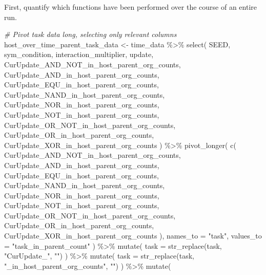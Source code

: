 \documentclass[
]{book}
\newenvironment{Shaded}{\begin{snugshade}}{\end{snugshade}}
\newcommand{\AttributeTok}[1]{\textcolor[rgb]{0.77,0.63,0.00}{#1}}
\newcommand{\CommentTok}[1]{\textcolor[rgb]{0.56,0.35,0.01}{\textit{#1}}}
\newcommand{\FunctionTok}[1]{\textcolor[rgb]{0.00,0.00,0.00}{#1}}
\newcommand{\NormalTok}[1]{#1}
\newcommand{\OtherTok}[1]{\textcolor[rgb]{0.56,0.35,0.01}{#1}}
\newcommand{\SpecialCharTok}[1]{\textcolor[rgb]{0.00,0.00,0.00}{#1}}
\newcommand{\StringTok}[1]{\textcolor[rgb]{0.31,0.60,0.02}{#1}}
\begin{document}
First, quantify which functions have been performed over the course of an entire run.

\begin{Shaded}
\begin{Highlighting}[]
\CommentTok{\# Pivot task data long, selecting only relevant columns}
\NormalTok{host\_over\_time\_parent\_task\_data }\OtherTok{\textless{}{-}}\NormalTok{ time\_data }\SpecialCharTok{\%\textgreater{}\%}
  \FunctionTok{select}\NormalTok{(}
\NormalTok{    SEED,}
\NormalTok{    sym\_condition,}
\NormalTok{    interaction\_multiplier,}
\NormalTok{    update,}
\NormalTok{    CurUpdate\_AND\_NOT\_in\_host\_parent\_org\_counts,}
\NormalTok{    CurUpdate\_AND\_in\_host\_parent\_org\_counts,}
\NormalTok{    CurUpdate\_EQU\_in\_host\_parent\_org\_counts,}
\NormalTok{    CurUpdate\_NAND\_in\_host\_parent\_org\_counts,}
\NormalTok{    CurUpdate\_NOR\_in\_host\_parent\_org\_counts,}
\NormalTok{    CurUpdate\_NOT\_in\_host\_parent\_org\_counts,}
\NormalTok{    CurUpdate\_OR\_NOT\_in\_host\_parent\_org\_counts,}
\NormalTok{    CurUpdate\_OR\_in\_host\_parent\_org\_counts,}
\NormalTok{    CurUpdate\_XOR\_in\_host\_parent\_org\_counts}
\NormalTok{  ) }\SpecialCharTok{\%\textgreater{}\%}
  \FunctionTok{pivot\_longer}\NormalTok{(}
    \FunctionTok{c}\NormalTok{(}
\NormalTok{      CurUpdate\_AND\_NOT\_in\_host\_parent\_org\_counts,}
\NormalTok{      CurUpdate\_AND\_in\_host\_parent\_org\_counts,}
\NormalTok{      CurUpdate\_EQU\_in\_host\_parent\_org\_counts,}
\NormalTok{      CurUpdate\_NAND\_in\_host\_parent\_org\_counts,}
\NormalTok{      CurUpdate\_NOR\_in\_host\_parent\_org\_counts,}
\NormalTok{      CurUpdate\_NOT\_in\_host\_parent\_org\_counts,}
\NormalTok{      CurUpdate\_OR\_NOT\_in\_host\_parent\_org\_counts,}
\NormalTok{      CurUpdate\_OR\_in\_host\_parent\_org\_counts,}
\NormalTok{      CurUpdate\_XOR\_in\_host\_parent\_org\_counts}
\NormalTok{    ),}
    \AttributeTok{names\_to =} \StringTok{"task"}\NormalTok{,}
    \AttributeTok{values\_to =} \StringTok{"task\_in\_parent\_count"}
\NormalTok{  ) }\SpecialCharTok{\%\textgreater{}\%}
  \FunctionTok{mutate}\NormalTok{(}
    \AttributeTok{task =} \FunctionTok{str\_replace}\NormalTok{(task, }\StringTok{"CurUpdate\_"}\NormalTok{, }\StringTok{""}\NormalTok{)}
\NormalTok{  ) }\SpecialCharTok{\%\textgreater{}\%}
  \FunctionTok{mutate}\NormalTok{(}
    \AttributeTok{task =} \FunctionTok{str\_replace}\NormalTok{(task, }\StringTok{"\_in\_host\_parent\_org\_counts"}\NormalTok{, }\StringTok{""}\NormalTok{)}
\NormalTok{  ) }\SpecialCharTok{\%\textgreater{}\%}
  \FunctionTok{mutate}\NormalTok{(}

\end{Highlighting}
\end{Shaded}
\end{document}
